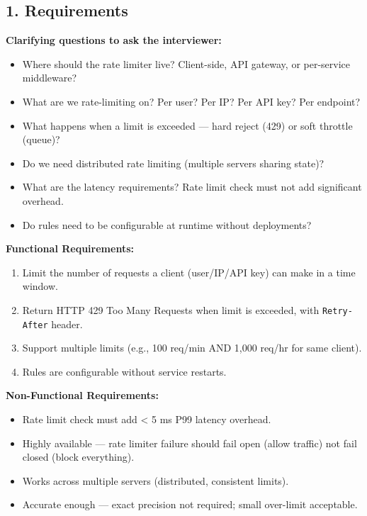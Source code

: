 \documentclass[11pt]{article}
\providecommand{\tightlist}{\setlength{\itemsep}{1pt}\setlength{\parskip}{0pt}}
\begin{document}

\subsection{1. Requirements}\label{1-requirements-1}

\textbf{Clarifying questions to ask the interviewer:}

\begin{itemize}
\tightlist
\item
  Where should the rate limiter live? Client-side, API gateway, or per-service middleware?
\item
  What are we rate-limiting on? Per user? Per IP? Per API key? Per endpoint?
\item
  What happens when a limit is exceeded --- hard reject (429) or soft throttle (queue)?
\item
  Do we need distributed rate limiting (multiple servers sharing state)?
\item
  What are the latency requirements? Rate limit check must not add significant overhead.
\item
  Do rules need to be configurable at runtime without deployments?
\end{itemize}

\textbf{Functional Requirements:}

\begin{enumerate}
\def\labelenumi{\arabic{enumi}.}
\tightlist
\item
  Limit the number of requests a client (user/IP/API key) can make in a time window.
\item
  Return HTTP 429 Too Many Requests when limit is exceeded, with \texttt{Retry-After} header.
\item
  Support multiple limits (e.g., 100 req/min AND 1,000 req/hr for same client).
\item
  Rules are configurable without service restarts.
\end{enumerate}

\textbf{Non-Functional Requirements:}

\begin{itemize}
\tightlist
\item
  Rate limit check must add \textless{} 5 ms P99 latency overhead.
\item
  Highly available --- rate limiter failure should fail open (allow traffic) not fail closed (block everything).
\item
  Works across multiple servers (distributed, consistent limits).
\item
  Accurate enough --- exact precision not required; small over-limit acceptable.
\end{itemize}
\end{document}
